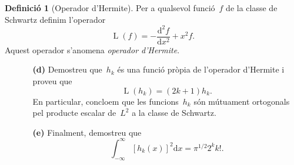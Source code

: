 \documentclass[a4paper]{article}
\theoremstyle{plain}
\theoremstyle{definition}
\newtheorem{definition}{Definició}
\DeclareMathOperator{\Lop}{L}
\providecommand{\uppi}{\pi}
\newcommand{\diff}{\mathrm{d}}
\begin{document}
\begin{definition}[Operador d'Hermite]
    Per a qualsevol funció~\(f\) de la classe de Schwartz definim l'operador
    \[
        \Lop(f) = -\frac{\diff^{2} f}{\diff x^{2}} + x^{2}f.
    \]
    Aquest operador s'anomena \emph{operador d'Hermite}.
\end{definition}

\begin{enumerate}
    \item[]\begin{enumerate}
        \item[\textbf{(d)}] Demostreu que~\(h_{k}\) és una funció pròpia de
            l'operador d'Hermite i proveu que
            \[
                \Lop(h_{k}) = (2k+1)h_{k}.
            \]
            En particular, concloem que les funcions~\(h_{k}\) són mútuament
            ortogonals pel producte escalar de~\(L^{2}\) a la classe de
            Schwartz.
    \end{enumerate}
\end{enumerate}

\begin{enumerate}
    \item[]\begin{enumerate}
        \item[\textbf{(e)}] Finalment, demostreu que
            \[
                \int_{-\infty}^{\infty}
                [h_{k}(x)]^{2}\diff x
                =
                \uppi^{1/2}2^{k}k!.
            \]
    \end{enumerate}
\end{enumerate}
\end{document}
